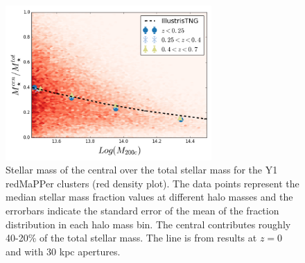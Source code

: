 {\begin{figure}\centering \includegraphics[width=0.7\textwidth]{./chapters/chapter6/figs/fcen_chab_Dec17.png}\caption{Stellar mass of the central over the total stellar mass for the Y1 redMaPPer clusters (red density plot). The data points represent the median stellar mass fraction values at different halo masses and the errorbars indicate the standard error of the mean of the fraction distribution in each halo mass bin. The central contributes roughly 40-20\% of the total stellar mass. The line is from \citet{illustris} results at $z=0$ and with 30 kpc apertures.}\label{smcentot}\end{figure}


}
